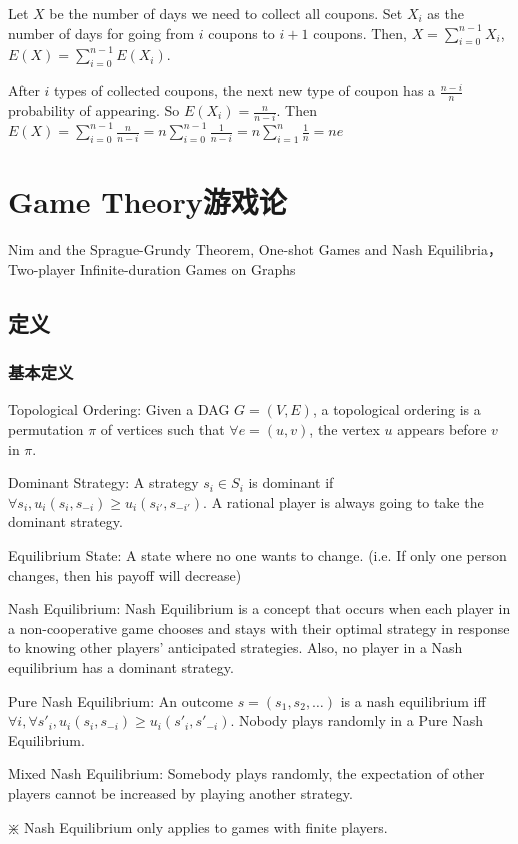 \documentclass[12pt,a4paper]{ctexrep}
\begin{document}
Let $X$ be the number of days we need to collect all coupons. Set $X_i$ as the number of days for going from $i$ coupons to $i+1$ coupons. Then, $X = \sum_{i=0}^{n-1} X_i$, $E(X) = \sum_{i=0}^{n-1} E(X_i)$.

After $i$ types of collected coupons, the next new type of coupon has a $\frac{n-i}{n}$ probability of appearing. So $E(X_i) = \frac{n}{n-i}$. Then $E(X) = \sum_{i=0}^{n-1} \frac{n}{n-i} = n \sum_{i=0}^{n-1}\frac{1}{n-i} = n \sum_{i=1}^{n} \frac{1}{n} = ne$

\chapter{Game Theory游戏论}
Nim and the Sprague-Grundy Theorem, One-shot Games and Nash Equilibria， Two-player Infinite-duration Games on Graphs
\section{定义}
\subsection{基本定义}
Topological Ordering: Given a DAG $G = (V,E)$, a topological ordering is a permutation $\pi$ of vertices such that $\forall e = (u,v)$, the vertex $u$ appears before $v$ in $\pi$.

Dominant Strategy: A strategy $s_i \in S_i$ is dominant if $\forall s_i, u_i(s_i,s_{-i}) \geqslant u_i(s_{i'},s_{-i'})$. A rational player is always going to take the dominant strategy.

Equilibrium State: A state where no one wants to change. (i.e. If only one person changes, then his payoff will decrease)

Nash Equilibrium: Nash Equilibrium is a concept that occurs when each player in a non-cooperative game chooses and stays with their optimal strategy in response to knowing other players' anticipated strategies. Also, no player in a Nash equilibrium has a dominant strategy.

Pure Nash Equilibrium: An outcome $s = (s_1,s_2,\dots)$ is a nash equilibrium iff $\forall i, \forall s'_i, u_i(s_i,s_{-i}) \geqslant u_i(s'_i,s'_{-i})$. Nobody plays randomly in a Pure Nash Equilibrium.

Mixed Nash Equilibrium: Somebody plays randomly, the expectation of other players cannot be increased by playing another strategy.

$\divideontimes$ Nash Equilibrium only applies to games with finite players.\\
\end{document}
